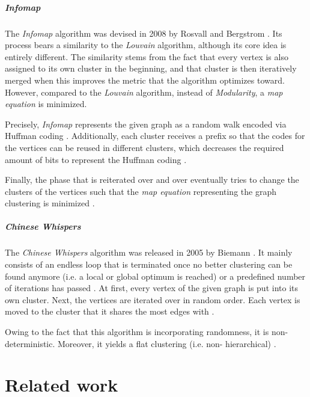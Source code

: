 \documentclass[12pt,a4paper]{report}
\begin{document}
\paragraph{Infomap \cite{rosvall2008infomap}}
The \textit{Infomap} algorithm
was devised in 2008 by Rosvall and Bergstrom \cite{rosvall2008infomap}. Its
process bears a similarity to the \textit{Louvain} algorithm, although its core
idea is entirely different. The similarity stems from the fact that every
vertex is also assigned to its own cluster in the beginning, and that cluster
is then iteratively merged when this improves the metric that the algorithm
optimizes toward. However, compared to the \textit{Louvain} algorithm, instead
of \textit{Modularity}, a \textit{map equation} is minimized.

Precisely, \textit{Infomap} represents the given graph as a random walk encoded
via Huffman coding \cite{huffman1952coding}. Additionally, each cluster
receives a prefix so that the codes for the vertices can be reused in different
clusters, which decreases the required amount of bits to represent the Huffman
coding \cite{rosvall2008infomap}.

Finally, the phase that is reiterated over and over eventually tries to change
the clusters of the vertices such that the \textit{map equation} representing
the graph clustering is minimized \cite{rosvall2008infomap}.

\paragraph{Chinese Whispers \cite{biemann2006chinese}}
The \textit{Chinese Whispers} algorithm was released in 2005 by Biemann
\cite{biemann2006chinese}.
It mainly consists of an endless loop that is terminated once no better
clustering can be found anymore (i.e. a local or global optimum is reached) or
a predefined number of iterations has passed \cite{biemann2006chinese}. At
first, every vertex of the given graph is put into its own cluster. Next, the
vertices are iterated over in random order. Each vertex is moved to the cluster
that it shares the most edges with \cite{biemann2006chinese}.

Owing to the fact that this algorithm is incorporating randomness, it is
non\hyp deterministic. Moreover, it yields a flat clustering (i.e. non\hyp
hierarchical) \cite{biemann2006chinese}.




\chapter{Related work} \label{chap:related}
\end{document}
